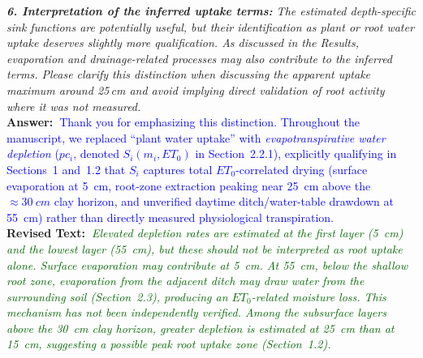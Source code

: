 \documentclass[10pt]{article}
\newcommand{\query}[2][]{\ifthenelse{\equal{#1}{}}{}{\textbf{#1:}~}\emph{#2}}
\newcommand{\ans}[1]{\textbf{Answer:~}#1}
\newcommand{\Rtext}[1]{\textbf{Revised Text:~}#1}
\begin{document}
\query[R-2.6]{\textbf{6. Interpretation of the inferred uptake terms:} The estimated depth-specific sink functions are potentially useful, but their identification as plant or root water uptake deserves slightly more qualification. As discussed in the Results, evaporation and drainage-related processes may also contribute to the inferred terms. Please clarify this distinction when discussing the apparent uptake maximum around 25\,cm and avoid implying direct validation of root activity where it was not measured.}\\
\ans{\textcolor{blue}{Thank you for emphasizing this distinction. Throughout the manuscript, we replaced ``plant water uptake'' with \emph{evapotranspirative water depletion} ($pc_i$, denoted $S_i(m_i, ET_0)$ in Section~2.2.1), explicitly qualifying in Sections~1 and~1.2 that $S_i$ captures total $ET_0$-correlated drying (surface evaporation at 5~\si{cm}, root-zone extraction peaking near 25~\si{cm} above the $\approx\SI{30}{cm}$ clay horizon, and unverified daytime ditch/water-table drawdown at 55~\si{cm}) rather than directly measured physiological transpiration.}}\\
\Rtext{\emph{\textcolor{darkgreen}{Elevated depletion rates are estimated at the first layer (5~\si{cm}) and the lowest layer (55~\si{cm}), but these should not be interpreted as root uptake alone. Surface evaporation may contribute at 5~\si{cm}. At 55~\si{cm}, below the shallow root zone, evaporation from the adjacent ditch may draw water from the surrounding soil (Section~2.3), producing an $ET_0$-related moisture loss. This mechanism has not been independently verified. Among the subsurface layers above the \SI{30}{cm} clay horizon, greater depletion is estimated at 25~\si{cm} than at 15~\si{cm}, suggesting a possible peak root uptake zone (Section~1.2).}}}
\end{document}
